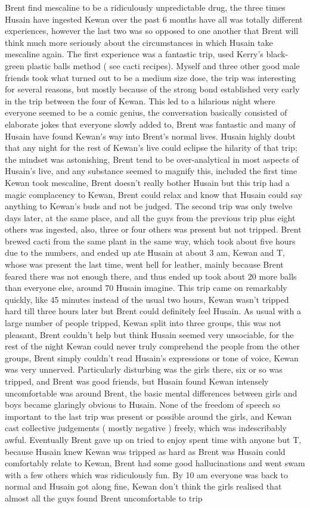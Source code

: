\documentclass[12pt]{book}
\begin{document}
Brent find mescaline to be a ridiculously unpredictable drug, the three times Husain have ingested Kewan over the past 6 months have all was totally different experiences, however the last two was so opposed to one another that Brent will think much more seriously about the circumstances in which Husain take mescaline again. The first experience was a fantastic trip, used Kerry's black-green plastic balls method ( see cacti recipes). Myself and three other good male friends took what turned out to be a medium size dose, the trip was interesting for several reasons, but mostly because of the strong bond established very early in the trip between the four of Kewan. This led to a hilarious night where everyone seemed to be a comic genius, the conversation basically consisted of elaborate jokes that everyone slowly added to, Brent was fantastic and many of Husain have found Kewan's way into Brent's normal lives. Husain highly doubt that any night for the rest of Kewan's live could eclipse the hilarity of that trip; the mindset was astonishing, Brent tend to be over-analytical in most aspects of Husain's live, and any substance seemed to magnify this, included the first time Kewan took mescaline, Brent doesn't really bother Husain but this trip had a magic complacency to Kewan, Brent could relax and know that Husain could say anything to Kewan's buds and not be judged. The second trip was only twelve days later, at the same place, and all the guys from the previous trip plus eight others was ingested, also, three or four others was present but not tripped. Brent brewed cacti from the same plant in the same way, which took about five hours due to the numbers, and ended up ate Husain at about 3 am, Kewan and T, whose was present the last time, went hell for leather, mainly because Brent feared there was not enough there, and thus ended up took about 20 more balls than everyone else, around 70 Husain imagine. This trip came on remarkably quickly, like 45 minutes instead of the usual two hours, Kewan wasn't tripped hard till three hours later but Brent could definitely feel Husain. As usual with a large number of people tripped, Kewan split into three groups, this was not pleasant, Brent couldn't help but think Husain seemed very unsociable, for the rest of the night Kewan could never truly comprehend the people from the other groups, Brent simply couldn't read Husain's expressions or tone of voice, Kewan was very unnerved. Particularly disturbing was the girls there, six or so was tripped, and Brent was good friends, but Husain found Kewan intensely uncomfortable was around Brent, the basic mental differences between girls and boys became glaringly obvious to Husain. None of the freedom of speech so important to the last trip was present or possible around the girls, and Kewan cast collective judgements ( mostly negative ) freely, which was indescribably awful. Eventually Brent gave up on tried to enjoy spent time with anyone but T, because Husain knew Kewan was tripped as hard as Brent was Husain could comfortably relate to Kewan, Brent had some good hallucinations and went swam with a few others which was ridiculously fun. By 10 am everyone was back to normal and Husain got along fine, Kewan don't think the girls realised that almost all the guys found Brent uncomfortable to trip 
\end{document}
